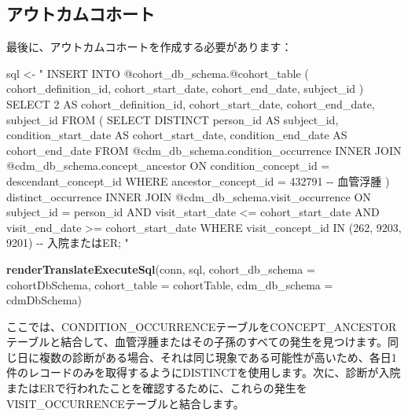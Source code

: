 \documentclass[
  11pt]{book}
\newenvironment{Shaded}{\begin{snugshade}}{\end{snugshade}}
\newcommand{\AttributeTok}[1]{\textcolor[rgb]{0.13,0.29,0.53}{#1}}
\newcommand{\FunctionTok}[1]{\textcolor[rgb]{0.13,0.29,0.53}{\textbf{#1}}}
\newcommand{\NormalTok}[1]{#1}
\newcommand{\OtherTok}[1]{\textcolor[rgb]{0.56,0.35,0.01}{#1}}
\newcommand{\StringTok}[1]{\textcolor[rgb]{0.31,0.60,0.02}{#1}}
\theoremstyle{definition}
\theoremstyle{definition}
\theoremstyle{definition}
\theoremstyle{definition}
\theoremstyle{remark}
\begin{document}
\subsection{アウトカムコホート}\label{ux30a2ux30a6ux30c8ux30abux30e0ux30b3ux30dbux30fcux30c8}

最後に、アウトカムコホートを作成する必要があります：

\begin{Shaded}
\begin{Highlighting}[]
\NormalTok{sql }\OtherTok{\textless{}{-}} \StringTok{"}
\StringTok{INSERT INTO @cohort\_db\_schema.@cohort\_table (}
\StringTok{ cohort\_definition\_id,}
\StringTok{ cohort\_start\_date,}
\StringTok{ cohort\_end\_date,}
\StringTok{subject\_id}
\StringTok{)}
\StringTok{SELECT 2 AS cohort\_definition\_id,}
\StringTok{  cohort\_start\_date,}
\StringTok{  cohort\_end\_date,}
\StringTok{  subject\_id}
\StringTok{FROM (}
\StringTok{  SELECT DISTINCT person\_id AS subject\_id,}
\StringTok{    condition\_start\_date AS cohort\_start\_date,}
\StringTok{    condition\_end\_date AS cohort\_end\_date}
\StringTok{  FROM @cdm\_db\_schema.condition\_occurrence}
\StringTok{  INNER JOIN @cdm\_db\_schema.concept\_ancestor}
\StringTok{    ON condition\_concept\_id = descendant\_concept\_id}
\StringTok{  WHERE ancestor\_concept\_id = 432791 {-}{-} 血管浮腫}
\StringTok{) distinct\_occurrence}
\StringTok{INNER JOIN @cdm\_db\_schema.visit\_occurrence}
\StringTok{  ON subject\_id = person\_id}
\StringTok{  AND visit\_start\_date \textless{}= cohort\_start\_date}
\StringTok{  AND visit\_end\_date \textgreater{}= cohort\_start\_date}
\StringTok{WHERE visit\_concept\_id IN (262, 9203,}
\StringTok{    9201) {-}{-} 入院またはER;}
\StringTok{"}

\FunctionTok{renderTranslateExecuteSql}\NormalTok{(conn, sql,}
                          \AttributeTok{cohort\_db\_schema =}\NormalTok{ cohortDbSchema,}
                          \AttributeTok{cohort\_table =}\NormalTok{ cohortTable,}
                          \AttributeTok{cdm\_db\_schema =}\NormalTok{ cdmDbSchema)}
\end{Highlighting}
\end{Shaded}

ここでは、CONDITION\_OCCURRENCEテーブルをCONCEPT\_ANCESTORテーブルと結合して、血管浮腫またはその子孫のすべての発生を見つけます。同じ日に複数の診断がある場合、それは同じ現象である可能性が高いため、各日1件のレコードのみを取得するようにDISTINCTを使用します。次に、診断が入院またはERで行われたことを確認するために、これらの発生をVISIT\_OCCURRENCEテーブルと結合します。
\end{document}
